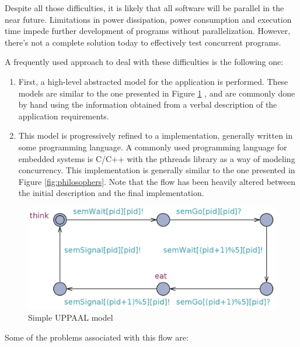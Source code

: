 \documentclass[conference]{IEEEtran}
\begin{document}
Despite all those difficulties, it is likely that all software will be parallel in the near future. Limitations in power dissipation, power consumption and execution time impede further development of programs without parallelization. However, there's not a complete solution today to effectively test concurrent programs.

A frequently used approach to deal with these difficulties is the following one:

\begin{enumerate}
    \item First, a high-level abstracted model for the application is performed. These models are similar to the one presented in Figure \ref{simple_philo} , and are commonly done by hand using the information obtained from a verbal description of the application requirements.
    \item This model is progressively refined to a implementation, generally written in some programming language. A commonly used programming language for embedded systems is C/C++ with the pthreads library as a way of modeling concurrency. This implementation is generally similar to the one presented in Figure \ref{fig:philosophers}. Note that the flow has been heavily altered between the initial description and the final implementation.
\end{enumerate}


\begin{figure}[b!]
\centering
\includegraphics[width=0.75\columnwidth]{media/simple_philo.png}
\caption{Simple UPPAAL model}
\label{simple_philo}
\end{figure}

Some of the problems associated with this flow are:
\end{document}
